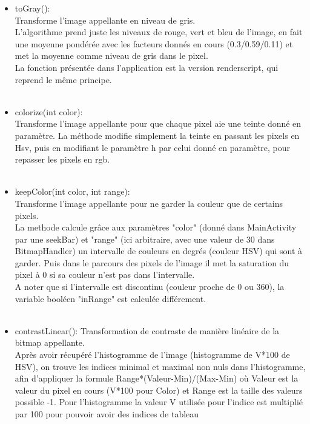 \documentclass[12pt]{article}
\begin{document}
    \begin{itemize}
        \item toGray():\\ 
        Transforme l'image appellante en niveau de gris.\\
        L'algorithme prend juste les niveaux de rouge, vert et bleu de l'image, en fait une moyenne pondérée avec les facteurs donnés en cours (0.3/0.59/0.11) 
        et met la moyenne comme niveau de gris dans le pixel.
        \\
        La fonction présentée dans l'application est la version renderscript, qui reprend le même principe.\\
        \\
        \item colorize(int color):\\
        Transforme l'image appellante pour que chaque pixel aie une teinte donné en paramètre.
        La méthode modifie simplement la teinte en passant les pixels en Hsv, puis en modifiant le paramètre h par celui donné en paramètre, pour repasser les pixels en rgb.\\ 
        \\
        \item keepColor(int color, int range):\\
        Transforme l'image appellante pour ne garder la couleur que de certains pixels.\\
        La methode calcule grâce aux paramètres "color" (donné dans MainActivity par une seekBar) et "range" (ici arbitraire, avec une valeur de 30 dans BitmapHandler) un intervalle de couleurs en degrés (couleur HSV) qui sont à garder. Puis dans le parcours des pixels de l'image il 
        met la saturation du pixel à 0 si sa couleur n'est pas dans l'intervalle.\\
        A noter que si l'intervalle est discontinu (couleur proche de 0 ou 360), la variable booléen "inRange" est calculée différement.\\
        \\
        \item contrastLinear():
        Transformation de contraste de manière linéaire de la bitmap appellante.\\
        Après avoir récupéré l'histogramme de l'image (histogramme de V*100 de HSV),
        on trouve les indices minimal et maximal non nuls dans l'histogramme, afin d'appliquer la formule Range*(Valeur-Min)/(Max-Min) où Valeur est 
        la valeur du pixel en cours (V*100 pour Color) et Range est la taille des valeurs possible -1. Pour l'histogramme la valeur V utilisée pour l'indice est multiplié par 100 pour pouvoir avoir des indices de tableau 

\end{itemize}
\end{document}
